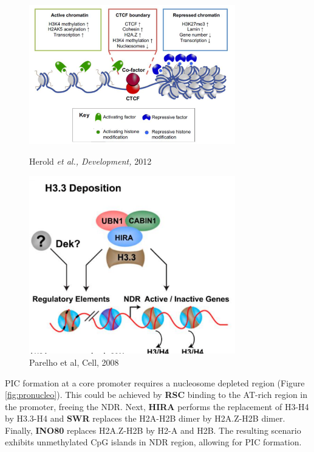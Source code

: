 \begin{figure}[!htb]
   \begin{minipage}{0.48\textwidth}
     \centering
     \includegraphics[width=0.8\textwidth]{../_resources/Screenshot_2022-10-14_at_12-11-11.png}
\caption{Herold \emph{et al., Development,} 2012}
\label{fig:h2az}
   \end{minipage}\hfill
   \begin{minipage}{0.48\textwidth}
     \centering
     \includegraphics[width=0.8\textwidth]{../_resources/Screen_Shot_2022-12-30_at_16-34-58.png}
\caption{Parelho et al, Cell, 2008}
\label{fig:h33}
   \end{minipage}
\end{figure}

PIC formation at a core promoter requires a nucleosome depleted region (Figure \ref{fig:pronucleo}). This could be achieved by \textbf{RSC} binding to the AT-rich region in the promoter, freeing the NDR. Next, \textbf{HIRA} performs the replacement of H3-H4 by H3.3-H4 and \textbf{SWR} replaces the H2A-H2B dimer by H2A.Z-H2B dimer. Finally, \textbf{INO80} replaces H2A.Z-H2B by H2-A and H2B. The resulting scenario exhibits unmethylated CpG islands in NDR region, allowing for PIC formation.

